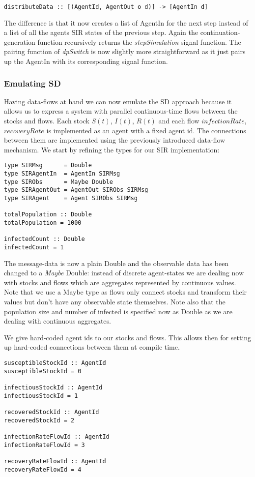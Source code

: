 \begin{verbatim}
distributeData :: [(AgentId, AgentOut o d)] -> [AgentIn d]
\end{verbatim}

The difference is that it now creates a list of AgentIn for the next step instead of a list of all the agents SIR states of the previous step. Again the continuation-generation function recursively returns the \textit{stepSimulation} signal function. The pairing function of \textit{dpSwitch} is now slightly more straightforward as it just pairs up the AgentIn with its corresponding signal function. 

\subsubsection{Emulating SD}
Having data-flows at hand we can now emulate the SD approach because it allows us to express a system with parallel continuous-time flows between the stocks and flows. Each stock $S(t)$, $I(t)$, $R(t)$ and each flow $infectionRate$, $recoveryRate$ is implemented as an agent with a fixed agent id. The connections between them are implemented using the previously introduced data-flow mechanism. We start by refining the types for our SIR implementation:

\begin{verbatim}
type SIRMsg      = Double
type SIRAgentIn  = AgentIn SIRMsg
type SIRObs      = Maybe Double
type SIRAgentOut = AgentOut SIRObs SIRMsg
type SIRAgent    = Agent SIRObs SIRMsg

totalPopulation :: Double
totalPopulation = 1000

infectedCount :: Double
infectedCount = 1
\end{verbatim}

The message-data is now a plain Double and the observable data has been changed to a \textit{Maybe} Double: instead of discrete agent-states we are dealing now with stocks and flows which are aggregates represented by continuous values. Note that we use a Maybe type as flows only connect stocks and transform their values but don't have any observable state themselves. Note also that the population size and number of infected is specified now as Double as we are dealing with continuous aggregates.

We give hard-coded agent ids to our stocks and flows. This allows then for setting up hard-coded connections between them at compile time.
\begin{verbatim}
susceptibleStockId :: AgentId
susceptibleStockId = 0

infectiousStockId :: AgentId
infectiousStockId = 1

recoveredStockId :: AgentId
recoveredStockId = 2

infectionRateFlowId :: AgentId
infectionRateFlowId = 3

recoveryRateFlowId :: AgentId
recoveryRateFlowId = 4
\end{verbatim}

